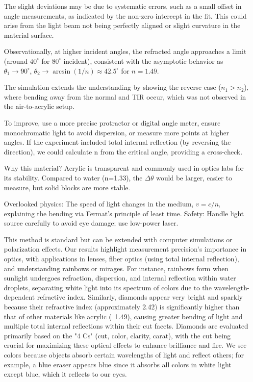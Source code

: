 \documentclass[12pt, a4paper]{article}
\begin{document}
The slight deviations may be due to systematic errors, such as a small offset in angle measurements, as indicated by the non-zero intercept in the fit. This could arise from the light beam not being perfectly aligned or slight curvature in the material surface.

Observationally, at higher incident angles, the refracted angle approaches a limit (around $40^\circ$ for $80^\circ$ incident), consistent with the asymptotic behavior as $\theta_1 \to 90^\circ$, $\theta_2 \to \arcsin(1/n) \approx 42.5^\circ$ for $n=1.49$.

The simulation extends the understanding by showing the reverse case ($n_1 > n_2$), where bending away from the normal and TIR occur, which was not observed in the air-to-acrylic setup.

To improve, use a more precise protractor or digital angle meter, ensure monochromatic light to avoid dispersion, or measure more points at higher angles. If the experiment included total internal reflection (by reversing the direction), we could calculate n from the critical angle, providing a cross-check.

Why this material? Acrylic is transparent and commonly used in optics labs for its stability. Compared to water (n=1.33), the $\Delta \theta$ would be larger, easier to measure, but solid blocks are more stable.

Overlooked physics: The speed of light changes in the medium, $v = c/n$, explaining the bending via Fermat's principle of least time. Safety: Handle light source carefully to avoid eye damage; use low-power laser.

This method is standard but can be extended with computer simulations or polarization effects. Our results highlight measurement precision's importance in optics, with applications in lenses, fiber optics (using total internal reflection), and understanding rainbows or mirages. For instance, rainbows form when sunlight undergoes refraction, dispersion, and internal reflection within water droplets, separating white light into its spectrum of colors due to the wavelength-dependent refractive index. Similarly, diamonds appear very bright and sparkly because their refractive index (approximately 2.42) is significantly higher than that of other materials like acrylic (~1.49), causing greater bending of light and multiple total internal reflections within their cut facets. Diamonds are evaluated primarily based on the "4 Cs" (cut, color, clarity, carat), with the cut being crucial for maximizing these optical effects to enhance brilliance and fire. We see colors because objects absorb certain wavelengths of light and reflect others; for example, a blue eraser appears blue since it absorbs all colors in white light except blue, which it reflects to our eyes.
\end{document}
